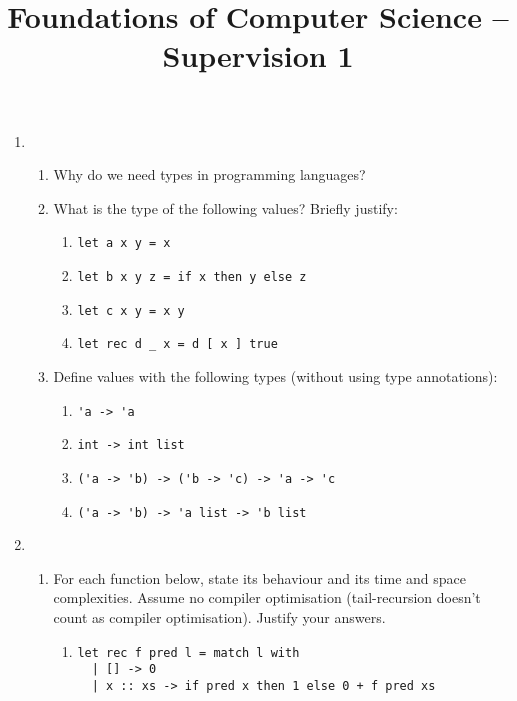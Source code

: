 \documentclass[11pt,a4paper]{article}
\title{Foundations of Computer Science -- Supervision 1}
\author{}
\date{}
\begin{document}
\maketitle



\begin{enumerate}

\item
\begin{enumerate}
    \item Why do we need types in programming languages?

    \item What is the type of the following values? Briefly justify:
    \begin{enumerate}
        \item \begin{verbatim}
let a x y = x
\end{verbatim}
        \item \begin{verbatim}
let b x y z = if x then y else z
\end{verbatim}
        \item \begin{verbatim}
let c x y = x y
\end{verbatim}
        \item \begin{verbatim}
let rec d _ x = d [ x ] true
\end{verbatim}
    \end{enumerate}

    \item Define values with the following types (without using type annotations):
    \begin{enumerate}
        \item \verb|'a -> 'a|
        \item \verb|int -> int list|
        \item \verb|('a -> 'b) -> ('b -> 'c) -> 'a -> 'c|
        \item \verb|('a -> 'b) -> 'a list -> 'b list|
    \end{enumerate}
\end{enumerate}

\item
\begin{enumerate}
    \item For each function below, state its behaviour and its time and space complexities. 
    Assume no compiler optimisation (tail-recursion doesn’t count as compiler optimisation). Justify your answers.
    \begin{enumerate}
        \item \begin{verbatim}
let rec f pred l = match l with
  | [] -> 0
  | x :: xs -> if pred x then 1 else 0 + f pred xs
\end{verbatim}


\end{enumerate}
\end{enumerate}
\end{enumerate}
\end{document}
